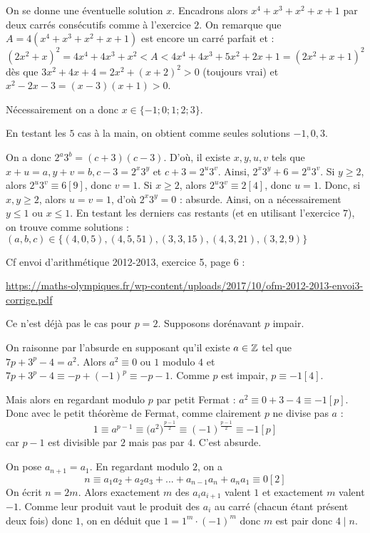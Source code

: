 \begin{sol}
On se donne une éventuelle solution $x$. Encadrons alors $x^4+x^3+x^2+x+1$ par deux carrés consécutifs comme à l'exercice $2$.
On remarque que $A=4(x^4+x^3+x^2+x+1)$ est encore un carré parfait et :
$$(2x^2+x)^2=4x^4+4x^3+x^2<A<4x^4+4x^3+5x^2+2x+1=(2x^2+x+1)^2$$
dès que $3x^2+4x+4=2x^2+(x+2)^2>0$ (toujours vrai) et $x^2-2x-3=(x-3)(x+1)>0$.

Nécessairement on a donc $x\in\{-1;0;1;2;3\}$.

En testant les $5$ cas à la main, on obtient comme seules solutions $-1,0,3$.
\end{sol}

\begin{sol} On a donc $2^a3^b=(c+3)(c-3)$.
D'où, il existe $x,y,u,v$ tels que $x+u=a, y+v=b, c-3=2^x3^y$ et $c+3=2^u3^v$. Ainsi, $2^x3^y+6=2^u3^v$.
Si $y\geq2$, alors $2^u3^v\equiv6[9]$, donc $v=1$.
Si $x\geq2$, alors $2^u3^v\equiv2[4]$, donc $u=1$.
Donc, si $x,y\geq2$, alors $u=v=1$, d'où $2^x3^y=0$ : absurde.
Ainsi, on a nécessairement $y\leq1$ ou $x\leq1$.
En testant les derniers cas restants (et en utilisant l'exercice $7$), on trouve comme solutions : $(a,b,c)\in \{(4,0,5),(4,5,51),(3,3,15),(4,3,21),(3,2,9)\}$
\end{sol}

\begin{sol}
Cf envoi d'arithmétique 2012-2013, exercice 5, page 6 :

\url{https://maths-olympiques.fr/wp-content/uploads/2017/10/ofm-2012-2013-envoi3-corrige.pdf}
\end{sol}


\begin{sol}
Ce n'est déjà pas le cas pour $p=2$. Supposons dorénavant $p$ impair.

On raisonne par l'absurde en supposant qu'il existe $a\in\mathbb Z$ tel que $7p+3^p-4=a^2$.
Alors $a^2\equiv0$ ou $1$ modulo $4$ et $7p+3^p-4\equiv-p+(-1)^p\equiv-p-1$.
Comme $p$ est impair, $p\equiv-1[4]$.

Mais alors en regardant modulo $p$ par petit Fermat : $a^2\equiv0+3-4\equiv-1[p]$.
Donc avec le petit théorème de Fermat, comme clairement $p$ ne divise pas $a$ : $$1\equiv a^{p-1}\equiv\big(a^2\big)^{\frac{p-1}2}\equiv(-1)^{\frac{p-1}2}\equiv-1[p]$$
car $p-1$ est divisible par $2$ mais pas par $4$. C'est absurde.
\end{sol}


\begin{sol}
On pose $a_{n+1}=a_1$.
En regardant modulo $2$, on a $$n\equiv a_1a_2+a_2a_3+...+a_{n-1}a_n+a_na_1\equiv 0[2]$$
On écrit $n=2m$. Alors exactement $m$ des $a_ia_{i+1}$ valent $1$ et exactement $m$ valent $-1$.
Comme leur produit vaut le produit des $a_i$ au carré (chacun étant présent deux fois) donc $1$, on en déduit que $1=1^m\cdot(-1)^m$ donc $m$ est pair donc $4\mid n$.
\end{sol}


